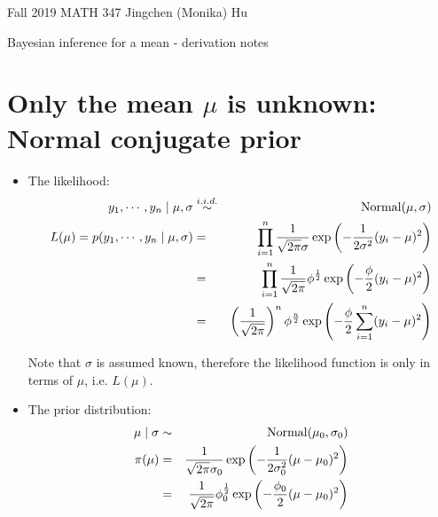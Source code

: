 \documentclass[11pt]{article}
\begin{document}
\enlargethispage{\baselineskip}

Fall 2019 MATH 347 \hfill Jingchen (Monika) Hu\\

\begin{center}
{\huge Bayesian inference for a mean - derivation notes}	\\
\end{center}
\vspace{0.5cm}


\section{Only the mean $\mu$ is unknown: Normal conjugate prior}



\begin{itemize}
\item The likelihood:
\begin{eqnarray}
y_1, \cdots, y_n \mid \mu, \sigma &\overset{i.i.d.}{\sim}& {\rm{Normal}}(\mu, \sigma)\\%
L(\mu) = p(y_1, \cdots, y_n \mid \mu, \sigma) &=& \prod_{i=1}^{n} \frac{1}{\sqrt{2\pi}\sigma}\exp\left(-\frac{1}{2\sigma^2}(y_i-\mu)^2\right) \nonumber \\
&=& \prod_{i=1}^{n} \frac{1}{\sqrt{2\pi}}\phi^{\frac{1}{2}} \exp\left(-\frac{\phi}{2}(y_i - \mu)^2\right) \nonumber \\
&=& \left(\frac{1}{\sqrt{2\pi}}\right)^n \phi^{\frac{n}{2}} \exp\left(-\frac{\phi}{2}\sum_{i=1}^{n}(y_i - \mu)^2\right) \nonumber \\
\end{eqnarray}


Note that $\sigma$ is assumed known, therefore the likelihood function is only in terms of $\mu$, i.e. $L(\mu)$.

\item The prior distribution:
\begin{eqnarray}
\mu \mid \sigma &\sim& {\rm{Normal}}(\mu_0, \sigma_0) \\%
\pi(\mu) &=& \frac{1}{\sqrt{2\pi}\sigma_0} \exp\left(-\frac{1}{2\sigma_0^2}(\mu - \mu_0)^2\right) \nonumber \\
&=& \frac{1}{\sqrt{2\pi}}\phi_0^{\frac{1}{2}} \exp\left(-\frac{\phi_0}{2}(\mu - \mu_0)^2\right) 
\end{eqnarray}



\end{itemize}
\end{document}
